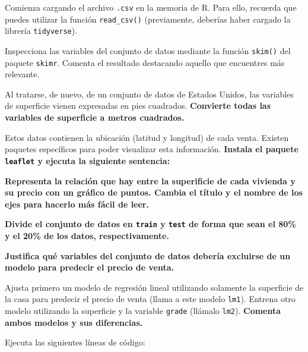 \documentclass[]{article}
\newenvironment{Shaded}{\begin{snugshade}}{\end{snugshade}}
\newcommand{\CommentTok}[1]{\textcolor[rgb]{0.56,0.35,0.01}{\textit{#1}}}
\newcommand{\KeywordTok}[1]{\textcolor[rgb]{0.13,0.29,0.53}{\textbf{#1}}}
\newcommand{\NormalTok}[1]{#1}
\newcommand{\OperatorTok}[1]{\textcolor[rgb]{0.81,0.36,0.00}{\textbf{#1}}}
\newcommand{\StringTok}[1]{\textcolor[rgb]{0.31,0.60,0.02}{#1}}
\begin{document}
Comienza cargando el archivo \texttt{.csv} en la memoria de R. Para
ello, recuerda que puedes utilizar la función \texttt{read\_csv()}
(previamente, deberías haber cargado la librería \texttt{tidyverse}).

Inspecciona las variables del conjunto de datos mediante la función
\texttt{skim()} del paquete \texttt{skimr}. Comenta el resultado
destacando aquello que encuentres más relevante.

Al tratarse, de nuevo, de un conjunto de datos de Estados Unidos, las
variables de superficie vienen expresadas en pies cuadrados.
\textbf{Convierte todas las variables de superficie a metros cuadrados.}

Estos datos contienen la ubicación (latitud y longitud) de cada venta.
Existen paquetes específicos para poder visualizar esta información.
\textbf{Instala el paquete \texttt{leaflet} y ejecuta la siguiente
sentencia:}

\begin{Shaded}
\end{Shaded}

\textbf{Representa la relación que hay entre la superificie de cada
vivienda y su precio con un gráfico de puntos. Cambia el título y el
nombre de los ejes para hacerlo más fácil de leer.}

\textbf{Divide el conjunto de datos en \texttt{train} y \texttt{test} de
forma que sean el 80\% y el 20\% de los datos, respectivamente.}

\textbf{Justifica qué variables del conjunto de datos debería excluirse
de un modelo para predecir el precio de venta.}

Ajusta primero un modelo de regresión lineal utilizando solamente la
superficie de la casa para predecir el precio de venta (llama a este
modelo \texttt{lm1}). Entrena otro modelo utilizando la superficie y la
variable \texttt{grade} (llámalo \texttt{lm2}). \textbf{Comenta ambos
modelos y sus diferencias.}

Ejecuta las siguientes líneas de código:
\end{document}
